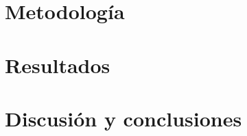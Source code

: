 \documentclass[colorinlistoftodos]{article}
\begin{document}
\section{Metodología}





\section{Resultados}

\section{Discusión y conclusiones}




\listoftodos%
\end{document}
